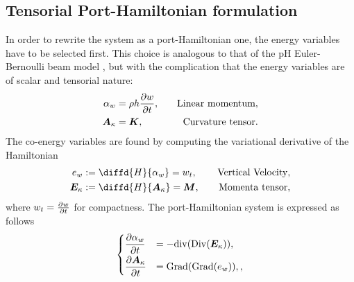 \documentclass[letterpaper, 10 pt, conference]{ieeeconf}
\begin{document}
\subsection{Tensorial Port-Hamiltonian formulation}
In order to rewrite the system as a port-Hamiltonian one, the energy variables have to be selected first. This  choice is analogous to that of the pH Euler-Bernoulli beam  model \cite{BrugnoliKir}, but with the complication that the energy variables are of scalar and tensorial nature:
\begin{equation}
\begin{aligned}
\alpha_w &= \rho h \diffp{w}{t}, \quad &\text{Linear momentum}, \\
\bm{A}_{\kappa} &= \bm{K}, \quad &\text{Curvature tensor}.\\
\end{aligned}
\end{equation}
The co-energy variables are found by computing the variational derivative of the Hamiltonian
\begin{equation}
\begin{aligned}
e_w &:= \diffd{H}{\alpha_w} = w_t, \quad &\text{Vertical Velocity}, \\
\bm{E}_{\kappa} &:= \diffd{H}{\bm{A}_{\kappa}} = \bm{M}, \quad &\text{Momenta tensor},\\
\end{aligned} 
\end{equation}
where $w_t = \diffp{w}{t}$ for compactness. The port-Hamiltonian system is expressed as follows 
\begin{equation}
\begin{cases}
\displaystyle\diffp{\alpha_w}{t} &= -\mathrm{div}(\mathrm{Div}(\bm{E}_{\kappa})), \vspace{1mm} \\
\displaystyle\diffp{\bm{A}_\kappa}{t} &= \mathrm{Grad}(\mathrm{Grad}(e_w)), ,
\end{cases}
\end{equation}
\end{document}
